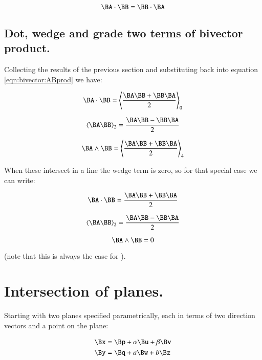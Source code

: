 \begin{equation}\label{eqn:bivector:dotsign}
\BA \cdot \BB = \BB \cdot \BA
\end{equation}

\subsection{Dot, wedge and grade two terms of bivector product. }

Collecting the results of the previous section and substituting back into equation \ref{eqn:bivector:ABprod} we have:

\begin{equation}\label{eqn:bivector:AdotB}
\BA \cdot \BB = \gpgrade{\frac{\BA \BB + \BB\BA}{2}}{0}
\end{equation}

\begin{equation}\label{eqn:bivector:AtwoB}
\gpgradetwo{\BA \BB} = \frac{\BA \BB - \BB\BA}{2}
\end{equation}

\begin{equation}\label{eqn:bivector:AwedgeB}
\BA \wedge \BB = \gpgrade{\frac{\BA \BB + \BB\BA}{2}}{4}
\end{equation}

When these intersect in a line the wedge term is zero, so for that special case we can write:

\begin{equation*}
\BA \cdot \BB = \frac{\BA \BB + \BB\BA}{2}
\end{equation*}

\begin{equation*}
\gpgradetwo{\BA \BB} = \frac{\BA \BB - \BB\BA}{2}
\end{equation*}

\begin{equation*}
\BA \wedge \BB = 0
\end{equation*}

(note that this is always the case for ).

\section{Intersection of planes. }

Starting with two planes specified parametrically, each in terms of two direction vectors and a point on the plane:

\begin{align}\label{eqn:bivector:twoplanes}
\Bx &= \Bp + \alpha \Bu + \beta \Bv \\
\By &= \Bq + a \Bw + b \Bz \\
\end{align}

